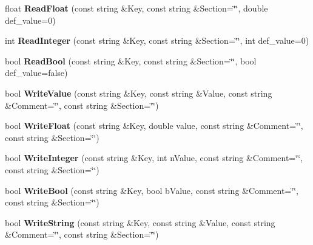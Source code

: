 \begin{DoxyCompactItemize}
\item 
\hypertarget{classrr_1_1_ini_file_aa176fc7df6bda8f1c1472bea7a9addc6}{float {\bfseries Read\-Float} (const string \&Key, const string \&Section=\char`\"{}\char`\"{}, double def\-\_\-value=0)}\label{classrr_1_1_ini_file_aa176fc7df6bda8f1c1472bea7a9addc6}

\item 
\hypertarget{classrr_1_1_ini_file_a37e6968493969d5990cf8b371d050085}{int {\bfseries Read\-Integer} (const string \&Key, const string \&Section=\char`\"{}\char`\"{}, int def\-\_\-value=0)}\label{classrr_1_1_ini_file_a37e6968493969d5990cf8b371d050085}

\item 
\hypertarget{classrr_1_1_ini_file_a764b97b4510f765e21d9c37d102f8d4e}{bool {\bfseries Read\-Bool} (const string \&Key, const string \&Section=\char`\"{}\char`\"{}, bool def\-\_\-value=false)}\label{classrr_1_1_ini_file_a764b97b4510f765e21d9c37d102f8d4e}

\item 
\hypertarget{classrr_1_1_ini_file_ad8d19bb0fb31a51b5b4619d5b44211bc}{bool {\bfseries Write\-Value} (const string \&Key, const string \&Value, const string \&Comment=\char`\"{}\char`\"{}, const string \&Section=\char`\"{}\char`\"{})}\label{classrr_1_1_ini_file_ad8d19bb0fb31a51b5b4619d5b44211bc}

\item 
\hypertarget{classrr_1_1_ini_file_ae592cbb7a5f2605dcf49f1fded994899}{bool {\bfseries Write\-Float} (const string \&Key, double value, const string \&Comment=\char`\"{}\char`\"{}, const string \&Section=\char`\"{}\char`\"{})}\label{classrr_1_1_ini_file_ae592cbb7a5f2605dcf49f1fded994899}

\item 
\hypertarget{classrr_1_1_ini_file_a073e519df19400685248dc67f6b57c7a}{bool {\bfseries Write\-Integer} (const string \&Key, int n\-Value, const string \&Comment=\char`\"{}\char`\"{}, const string \&Section=\char`\"{}\char`\"{})}\label{classrr_1_1_ini_file_a073e519df19400685248dc67f6b57c7a}

\item 
\hypertarget{classrr_1_1_ini_file_a90905ce6e586e318b978bf21a8c5558e}{bool {\bfseries Write\-Bool} (const string \&Key, bool b\-Value, const string \&Comment=\char`\"{}\char`\"{}, const string \&Section=\char`\"{}\char`\"{})}\label{classrr_1_1_ini_file_a90905ce6e586e318b978bf21a8c5558e}

\item 
\hypertarget{classrr_1_1_ini_file_a866bd7d05ee3b8b6a267661c3755d267}{bool {\bfseries Write\-String} (const string \&Key, const string \&Value, const string \&Comment=\char`\"{}\char`\"{}, const string \&Section=\char`\"{}\char`\"{})}\label{classrr_1_1_ini_file_a866bd7d05ee3b8b6a267661c3755d267}


\end{DoxyCompactItemize}
